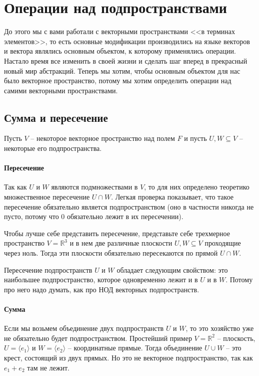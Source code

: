 \newpage
\section{Операции над подпространствами}

До этого мы с вами работали с векторными пространствами <<в терминах элементов>>, то есть основные модификации производились на языке векторов и вектора являлись основным объектом, к которому применялись операции.
Настало время все изменить в своей жизни и сделать шаг вперед в прекрасный новый мир абстракций.
Теперь мы хотим, чтобы основным объектом для нас было векторное пространство, потому мы хотим определить операции над самими векторными пространствами.

\subsection{Сумма и пересечение}

Пусть $V$ -- некоторое векторное пространство над полем $F$ и пусть $U, W \subseteq V$ -- некоторые его подпространства.

\paragraph{Пересечение}

Так как $U$ и $W$ являются подмножествами в $V$, то для них определено теоретико множественное пересечение $U\cap W$.
Легкая проверка показывает, что такое пересечение обязательно является подпространством (оно в частности никогда не пусто, потому что $0$ обязательно лежит в их пересечении).

Чтобы лучше себе представить пересечение, представьте себе трехмерное пространство $V = \mathbb R^3$ и в нем две различные плоскости $U,W\subseteq V$ проходящие через ноль.
Тогда эти плоскости обязательно пересекаются по прямой $U\cap W$.

Пересечение подпространств $U$ и $W$ обладает следующим свойством: это наибольшее подпространство, которое одновременно лежит и в $U$ и в $W$.
Потому про него надо думать, как про НОД векторных подпространств.

\paragraph{Сумма}

Если мы возьмем объединение двух подпространств $U$ и $W$, то это хозяйство уже не обязательно будет подпространством.
Простейший пример $V = \mathbb R^2$ -- плоскость, $U = \langle e_1\rangle$ и $W = \langle e_2 \rangle$ -- координатные прямые.
Тогда объединение $U\cup W$ -- это крест, состоящий из двух прямых.
Но это не векторное подпространство, так как $e_1 + e_2$ там не лежит.

